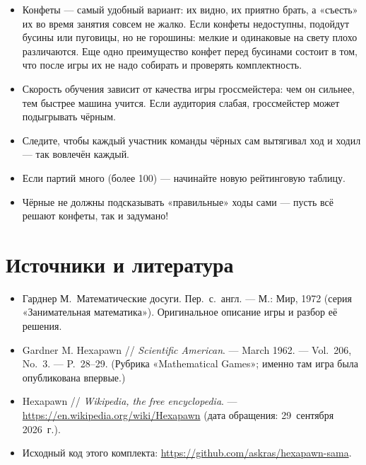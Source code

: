 \documentclass[12pt,a4paper]{article}
\begin{document}
\begin{itemize}[nosep]
\item Конфеты --- самый удобный вариант: их видно, их приятно брать, а «съесть» их во время занятия совсем не жалко.
      Если конфеты недоступны, подойдут бусины или пуговицы, но не горошины:
      мелкие и одинаковые на свету плохо различаются.
      Еще одно преимущество конфет перед бусинами состоит в том, что после игры их не надо собирать и проверять
      комплектность.
\item Скорость обучения зависит от качества игры гроссмейстера:
      чем он сильнее, тем быстрее машина учится.
      Если аудитория слабая, гроссмейстер может подыгрывать чёрным.
\item Следите, чтобы каждый участник команды чёрных сам вытягивал ход и ходил --- так вовлечён каждый.
\item Если партий много (более 100) --- начинайте новую рейтинговую таблицу.
\item Чёрные не должны подсказывать «правильные» ходы сами --- пусть всё решают конфеты, так и задумано!
\end{itemize}


\section*{Источники и литература}

\begin{itemize}[nosep]
\item Гарднер М.~Математические досуги. Пер.~с.~англ. --- М.: Мир, 1972 (серия «Занимательная математика»).
      Оригинальное описание игры и разбор её решения.
\item Gardner M. Hexapawn // \emph{Scientific American}. --- March 1962. --- Vol.~206,
      No.~3. --- P.~28--29. (Рубрика «Mathematical Games»; именно там игра была опубликована впервые.)
\item Hexapawn // \emph{Wikipedia, the free encyclopedia}. ---
      \url{https://en.wikipedia.org/wiki/Hexapawn} (дата обращения: 29~сентября 2026~г.).
\item Исходный код этого комплекта: \url{https://github.com/askras/hexapawn-sama}.
\end{itemize}
\end{document}
